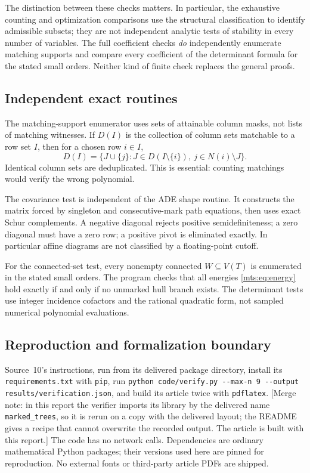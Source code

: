 \documentclass[11pt]{article}
\numberwithin{equation}{section}
\theoremstyle{definition}
\begin{document}
The distinction between these checks matters. In particular, the
exhaustive counting and optimization comparisons use the structural
classification to identify admissible subsets; they are not independent
analytic tests of stability in every number of variables. The full
coefficient checks \emph{do} independently enumerate matching supports
and compare every coefficient of the determinant formula for the stated
small orders. Neither kind of finite check replaces the general proofs.

\subsection{Independent exact routines}

The matching-support enumerator uses sets of attainable column masks,
not lists of matching witnesses. If $D(I)$ is the collection of column
sets matchable to a row set $I$, then for a chosen row $i\in I$,
\[
 D(I)=\{J\cup\{j\}:J\in D(I\setminus\{i\}),\ j\in N(i)\setminus J\}.
\]
Identical column sets are deduplicated. This is essential: counting
matchings would verify the wrong polynomial.

The covariance test is independent of the ADE shape routine. It constructs
the matrix forced by singleton and consecutive-mark path equations, then
uses exact Schur complements. A negative diagonal rejects positive
semidefiniteness; a zero diagonal must have a zero row; a positive pivot
is eliminated exactly. In particular affine diagrams are not classified
by a floating-point cutoff.

For the connected-set test, every nonempty connected $W\subseteq V(T)$
is enumerated in the stated small orders. The program checks that all
energies \eqref{mts:eq:energy} hold exactly if and only if no unmarked hull
branch exists. The determinant tests use integer incidence cofactors and
the rational quadratic form, not sampled numerical polynomial evaluations.

\subsection{Reproduction and formalization boundary}

Source~10's instructions, run from its delivered package directory, install
its \nolinkurl{requirements.txt} with \texttt{pip}, run
\texttt{python code/verify.py -{}-max-n 9 -{}-output results/verification.json},
and build its article twice with \texttt{pdflatex}.
[Merge note: in this report the verifier imports its library by the
delivered name \texttt{marked\_trees}, so it is rerun on a copy with the
delivered layout; the README gives a recipe that cannot overwrite the
recorded output. The article is built with this report.]
The code has no network calls. Dependencies are ordinary mathematical
Python packages; their versions used here are pinned for reproduction.
No external fonts or third-party article PDFs are shipped.
\end{document}
